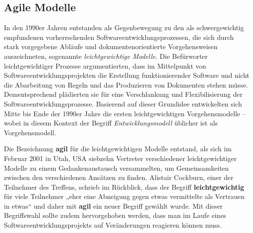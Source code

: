 \subsection{Agile Modelle}
\label{sec:Kap-2.2.3}


In den 1990er Jahren entstanden als Gegenbewegung zu den als schwergewichtig empfundenen vorherrschenden Softwareentwicklungsprozessen, die sich durch stark vorgegebene Abläufe und dokumentenorientierte Vorgehensweisen auszeichneten, sogenannte \textit{leichtgewichtige Modelle}. 
Die Befürworter leichtgewichtiger Prozesse argumentierten, dass im Mittelpunkt von Softwareentwicklungsprojekten die Erstellung funktionierender Software und nicht die Abarbeitung von Regeln und das Produzieren von Dokumenten stehen müsse. Dementsprechend plädierten sie für eine Verschlankung und Flexibilisierung der Softwareentwicklungsprozesse. Basierend auf dieser Grundidee entwickelten sich Mitte bis Ende der 1990er Jahre die ersten leichtgewichtigen Vorgehensmodelle – wobei in diesem Kontext der Begriff 
\textit{Entwicklungsmodell} üblicher ist als Vorgehensmodell.

Die Bezeichnung \textbf{agil} für die leichtgewichtigen Modelle entstand, als sich im Februar 2001 in Utah, USA siebzehn Vertreter verschiedener leichtgewichtiger Modelle zu einem Gedankenaustausch versammelten, um Gemeinsamkeiten zwischen den verschiedenen Ansätzen zu finden. Alistair Cockburn, einer der Teilnehmer des Treffens, schrieb im Rückblick, dass der Begriff \textbf{leichtgewichtig} für viele Teilnehmer „eher eine Abneigung gegen etwas vermittelte als Vertrauen in etwas“ \cite[281]{coc03} und daher mit \textbf{agil} ein neuer Begriff gewählt wurde. Mit dieser Begriffswahl sollte zudem hervorgehoben werden, dass man im Laufe eines Softwareentwicklungsprojekts auf Veränderungen reagieren können muss. 



